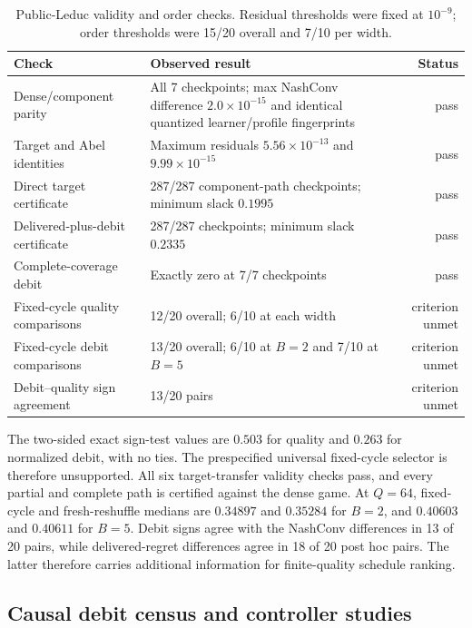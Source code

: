 \begin{table}[h]
\caption{Public-Leduc validity and order checks.  Residual thresholds were
fixed at $10^{-9}$; order thresholds were 15/20 overall and 7/10 per width.}
\label{tab:app-leduc-validity}
\centering\footnotesize
\begin{tabularx}{\linewidth}{@{}lXr@{}}
\toprule
Check & Observed result & Status \\
\midrule
Dense/component parity
& All 7 checkpoints; max NashConv difference $2.0\times10^{-15}$ and
identical quantized learner/profile fingerprints & pass \\
Target and Abel identities
& Maximum residuals $5.56\times10^{-13}$ and $9.99\times10^{-15}$ & pass \\
Direct target certificate
& 287/287 component-path checkpoints; minimum slack $0.1995$ & pass \\
Delivered-plus-debit certificate
& 287/287 checkpoints; minimum slack $0.2335$ & pass \\
Complete-coverage debit
& Exactly zero at 7/7 checkpoints & pass \\
Fixed-cycle quality comparisons
& 12/20 overall; 6/10 at each width & criterion unmet \\
Fixed-cycle debit comparisons
& 13/20 overall; 6/10 at $B=2$ and 7/10 at $B=5$ & criterion unmet \\
Debit--quality sign agreement
& 13/20 pairs & criterion unmet \\
\bottomrule
\end{tabularx}
\end{table}

The two-sided exact sign-test values are $0.503$ for quality and $0.263$ for
normalized debit, with no ties.  The prespecified universal fixed-cycle
selector is therefore unsupported.  All six target-transfer validity checks
pass, and every partial and complete path is certified against the dense game.
At $Q=64$, fixed-cycle and fresh-reshuffle medians are
$0.34897$ and $0.35284$ for $B=2$, and $0.40603$ and $0.40611$ for $B=5$.
Debit signs agree with the NashConv differences in 13 of 20 pairs, while
delivered-regret differences agree in 18 of 20 post hoc pairs.  The latter
therefore carries additional information for finite-quality schedule ranking.

\subsection{Causal debit census and controller studies}
\label{app:debit-controller-experiment}

